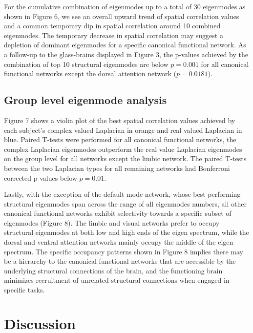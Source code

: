 \documentclass{article}
\begin{document}
For the cumulative combination of eigenmodes up to a total of 30 eigenmodes as shown in Figure 6, we see an overall upward trend of spatial correlation values and a common temporary dip in spatial correlation around 10 combined eigenmodes. The temporary decrease in spatial correlation may suggest a depletion of dominant eigenmodes for a specific canonical functional network. As a follow-up to the glass-brains displayed in Figure 3, the p-values achieved by the combination of top 10 structural eigenmodes are below $p = 0.001$ for all canonical functional networks except the dorsal attention network ($p = 0.0181$).

\subsection{Group level eigenmode analysis}
Figure 7 shows a violin plot of the best spatial correlation values achieved by each subject's complex valued Laplacian in orange and real valued Laplacian in blue. Paired T-tests were performed for all canonical functional networks, the complex Laplacian eigenmodes outperform the real value Laplacian eigenmodes on the group level for all networks except the limbic network. The paired T-tests between the two Laplacian types for all remaining networks had Bonferroni corrected p-values below $p = 0.01$. 

Lastly, with the exception of the default mode network, whose best performing structural eigenmodes span across the range of all eigenmodes numbers, all other canonical functional networks exhibit selectivity towards a specific subset of eigenmodes (Figure 8). The limbic and visual networks prefer to occupy structural eigenmodes at both low and high ends of the eigen spectrum, while the dorsal and ventral attention networks mainly occupy the middle of the eigen spectrum. The specific occupancy patterns shown in Figure 8 implies there may be a hierarchy to the canonical functional networks that are accessible by the underlying structural connections of the brain, and the functioning brain minimizes recruitment of unrelated structural connections when engaged in specific tasks. 

\section{Discussion}

  
  
\end{document}

